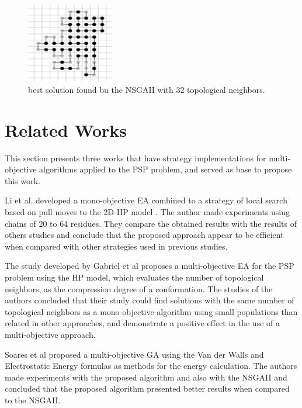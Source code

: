 \documentclass[conference]{IEEEtran}
\begin{document}
\begin{figure}[ht]
	\centering
	\includegraphics[width=1.5in]{figures/nsgaiibestresults.png}
	\caption{best solution found bu the NSGAII with 32 topological neighbors.}
	\label{bestSolutionNSGAII}
\end{figure}


\section{Related Works} \label{sec:related_works}


This section presents three works that have strategy implementations for multi-objective algorithms applied to the PSP problem, and served as base to propose this work.


Li et al. \cite{li2012genetic} developed a mono-objective EA combined to a strategy of local search based on pull moves to the 2D-HP model \cite{lesh2003complete}. The author made experiments using chains of 20 to 64 residues. They compare the obtained results with the results of others studies and conclude that the proposed approach appear to be efficient when compared with other strategies used in previous studies.


The study developed by Gabriel et al \cite{gabriel2012algoritmos} proposes a multi-objective EA for the PSP problem using the HP model, which evaluates the number of topological neighbors, as the compression degree of a conformation. The studies of the authors concluded that their study could find solutions with the same number of topological neighbors as a mono-objective algorithm using small populations than related in other approaches, and demonstrate a positive effect in the use of a multi-objective approach.


Soares et al \cite{soares2011investigating} proposed a multi-objective GA using the Van der Walls and Electrostatic Energy formulas as methods for the energy calculation. The authors made experiments with the proposed algorithm and also with the NSGAII \cite{deb2002fast} and concluded that the proposed algorithm presented better results when compared to the NSGAII.
\end{document}
